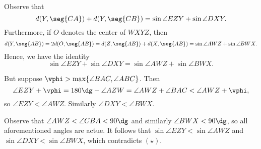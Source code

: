 Observe that
\[d(Y,\seg{CA})+d(Y,\seg{CB})=\sin\angle EZY+\sin\angle DXY.\]
Furthermore, if $O$ denotes the center of $WXYZ$, then
\[d(Y,\seg{AB})=2d(O,\seg{AB})=d(Z,\seg{AB})+d(X,\seg{AB})=\sin\angle AWZ+\sin\angle BWX.\]
Hence, we have the identity
\[\boxed{\sin\angle EZY+\sin\angle DXY=\sin\angle AWZ+\sin\angle BWX}.\tag{$\star$}\]

But suppose $\vphi>\max\{\angle BAC,\angle ABC\}$. Then
\[\angle EZY+\vphi=180\dg-\angle AZW=\angle AWZ+\angle BAC<\angle AWZ+\vphi,\]
so $\angle EZY<\angle AWZ$. Similarly $\angle DXY<\angle BWX$.

Observe that $\angle AWZ<\angle CBA<90\dg$ and similarly $\angle BWX<90\dg$, so all aforementioned angles are actue. It follows that $\sin\angle EZY<\sin\angle AWZ$ and $\sin\angle DXY<\sin\angle BWX$, which contradicts $(\star)$.


